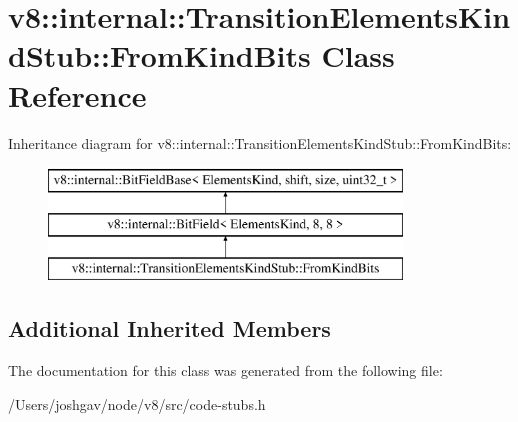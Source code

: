 \hypertarget{classv8_1_1internal_1_1_transition_elements_kind_stub_1_1_from_kind_bits}{}\section{v8\+:\+:internal\+:\+:Transition\+Elements\+Kind\+Stub\+:\+:From\+Kind\+Bits Class Reference}
\label{classv8_1_1internal_1_1_transition_elements_kind_stub_1_1_from_kind_bits}
Inheritance diagram for v8\+:\+:internal\+:\+:Transition\+Elements\+Kind\+Stub\+:\+:From\+Kind\+Bits\+:\begin{figure}[H]
\begin{center}
\leavevmode
\includegraphics[height=3.000000cm]{classv8_1_1internal_1_1_transition_elements_kind_stub_1_1_from_kind_bits}
\end{center}
\end{figure}
\subsection*{Additional Inherited Members}


The documentation for this class was generated from the following file\+:\begin{DoxyCompactItemize}
\item 
/\+Users/joshgav/node/v8/src/code-\/stubs.\+h\end{DoxyCompactItemize}
